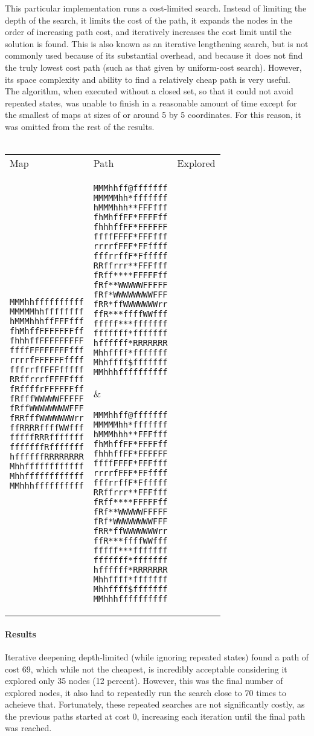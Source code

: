 \documentclass[12pt, article]{scrartcl}
\begin{document}
This particular implementation runs a cost-limited search. Instead of limiting the depth of the search, it limits the cost of the path, it expands the nodes in the order of increasing path cost, and iteratively increases the cost limit until the solution is found. This is also known as an iterative lengthening search, but is not commonly used because of its substantial overhead, and because it does not find the truly lowest cost path (such as that given by uniform-cost search). However, its space complexity and ability to find a relatively cheap path is very useful. \\ 

The algorithm, when executed without a closed set, so that it could not avoid repeated states, was unable to finish in a reasonable amount of time except for the smallest of maps at sizes of or around 5 by 5 coordinates. For this reason, it was omitted from the rest of the results. \\ \\
\begin{tabular}{p{2in} p{2in} p{2in}}
Map & Path & Explored \\

\begin{verbatim}
MMMhhffffffffff
MMMMMhhffffffff
hMMMhhhffFFFfff
fhMhffFFFFFFFff
fhhhffFFFFFFFFF
ffffFFFFFFFFfff
rrrrfFFFFFFffff
fffrrffFFFfffff
RRffrrrfFFFFfff
fRffffrFFFFFFff
fRfffWWWWWFFFFF
fRffWWWWWWWWFFF
fRRfffWWWWWWWrr
ffRRRRffffWWfff
fffffRRRfffffff
fffffffRfffffff
hffffffRRRRRRRR
Mhhffffffffffff
Mhhffffffffffff
MMhhhffffffffff
\end{verbatim}
&
\begin{verbatim}
MMMhhff@fffffff
MMMMMhh*fffffff
hMMMhhh**FFFfff
fhMhffFF*FFFFff
fhhhffFF*FFFFFF
ffffFFFF*FFFfff
rrrrfFFF*FFffff
fffrrffF*Ffffff
RRffrrr**FFFfff
fRff****FFFFFff
fRf**WWWWWFFFFF
fRf*WWWWWWWWFFF
fRR*ffWWWWWWWrr
ffR***ffffWWfff
fffff***fffffff
fffffff*fffffff
hffffff*RRRRRRR
Mhhffff*fffffff
Mhhffff$fffffff
MMhhhffffffffff
\end{verbatim}
&
\begin{verbatim}
MMMhhff@fffffff
MMMMMhh*fffffff
hMMMhhh**FFFfff
fhMhffFF*FFFFff
fhhhffFF*FFFFFF
ffffFFFF*FFFfff
rrrrfFFF*FFffff
fffrrffF*Ffffff
RRffrrr**FFFfff
fRff****FFFFFff
fRf**WWWWWFFFFF
fRf*WWWWWWWWFFF
fRR*ffWWWWWWWrr
ffR***ffffWWfff
fffff***fffffff
fffffff*fffffff
hffffff*RRRRRRR
Mhhffff*fffffff
Mhhffff$fffffff
MMhhhffffffffff
\end{verbatim}
\end{tabular}
\paragraph{Results}
Iterative deepening depth-limited (while ignoring repeated states) found a path of cost 69, which while not the cheapest, is incredibly acceptable considering it explored only 35 nodes (12 percent). However, this was the final number of explored nodes, it also had to repeatedly run the search close to 70 times to acheieve that. Fortunately, these repeated searches are not significantly costly, as the previous paths started at cost 0, increasing each iteration until the final path was reached.
\end{document}

